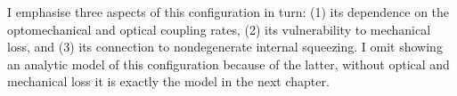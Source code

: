I emphasise three aspects of this configuration in turn: (1) its dependence on the optomechanical and optical coupling rates, (2) its vulnerability to mechanical loss, and (3) its connection to nondegenerate internal squeezing. I omit showing an analytic model of this configuration because of the latter, without optical and mechanical loss it is exactly the model in the next chapter. %


